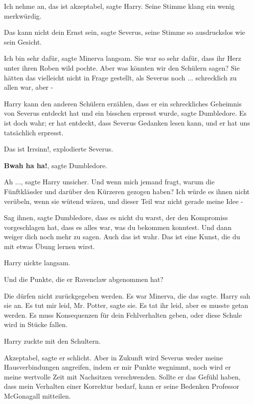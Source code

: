 \glqq{}Ich nehme an, das ist akzeptabel\grqq{}, sagte Harry. Seine Stimme klang
ein wenig merkwürdig.

\glqq{}Das kann nicht dein Ernst sein\grqq{}, sagte Severus, seine Stimme so
ausdruckslos wie sein Gesicht.

\glqq{}Ich bin sehr dafür\grqq{}, sagte Minerva langsam. Sie war so sehr dafür,
dass ihr Herz unter ihren Roben wild pochte. \glqq{}Aber was könnten wir den
Schülern sagen? Sie hätten das vielleicht nicht in Frage gestellt, als Severus
noch ... schrecklich zu allen war, aber -\grqq{}

\glqq{}Harry kann den anderen Schülern erzählen, dass er ein schreckliches
Geheimnis von Severus entdeckt hat und ein bisschen erpresst wurde\grqq{}, sagte
Dumbledore. \glqq{}Es ist doch wahr; er hat entdeckt, dass Severus Gedanken lesen
kann, und er hat uns tatsächlich erpresst.\grqq{}

\glqq{}Das ist Irrsinn!\grqq{}, explodierte Severus.

\glqq{}\textbf{Bwah ha ha!}\grqq{}, sagte Dumbledore.

\glqq{}Ah ...\grqq{}, sagte Harry unsicher. \glqq{}Und wenn mich jemand fragt,
warum die Fünftklässler und darüber den Kürzeren gezogen haben? Ich würde es
ihnen nicht verübeln, wenn sie wütend wären, und dieser Teil war nicht gerade
meine Idee -\grqq{}

\glqq{}Sag ihnen\grqq{}, sagte Dumbledore, \glqq{}dass es nicht du warst, der den
Kompromiss vorgeschlagen hat, dass es alles war, was du bekommen konntest. Und
dann weiger dich noch mehr zu sagen. Auch das ist wahr. Das ist eine Kunst, die
du mit etwas Übung lernen wirst.\grqq{}

Harry nickte langsam.

\glqq{}Und die Punkte, die er Ravenclaw abgenommen hat?\grqq{}

\glqq{}Die dürfen nicht zurückgegeben werden.\grqq{} Es war Minerva, die das
sagte. Harry sah sie an. \glqq{}Es tut mir leid, Mr. Potter\grqq{}, sagte sie. Es
tat ihr leid, aber es musste getan werden. \glqq{}Es muss Konsequenzen für dein
Fehlverhalten geben, oder diese Schule wird in Stücke fallen.\grqq{}

Harry zuckte mit den Schultern.

\glqq{}Akzeptabel\grqq{}, sagte er schlicht. \glqq{}Aber in Zukunft wird Severus
weder meine Hausverbindungen angreifen, indem er mir Punkte wegnimmt, noch wird
er meine wertvolle Zeit mit Nachsitzen verschwenden. Sollte er das Gefühl haben,
dass mein Verhalten einer Korrektur bedarf, kann er seine Bedenken Professor
McGonagall mitteilen.\grqq{}

